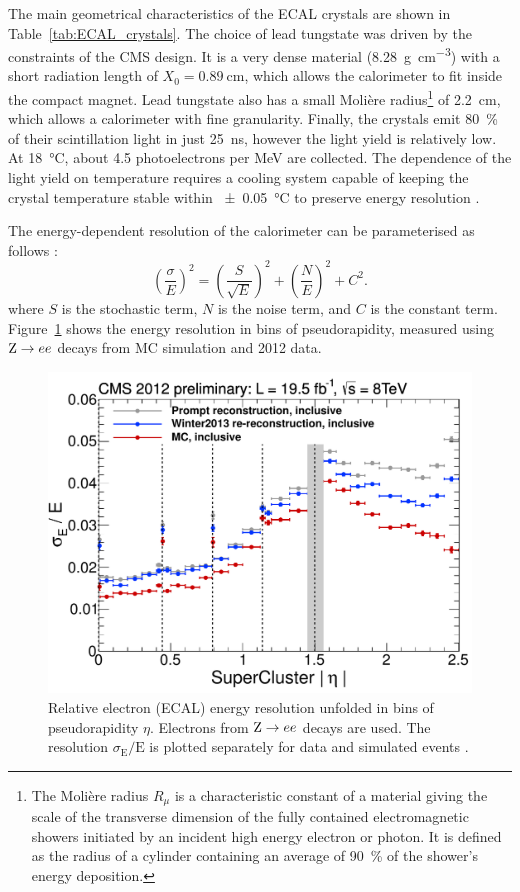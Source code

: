 The main geometrical characteristics of the ECAL crystals are shown in Table~\ref{tab:ECAL_crystals}. The choice of lead
tungstate was driven by the constraints of the CMS design. It is a very dense material (\SI{8.28}{g\per\cm\cubed}) with
a short radiation length of $X_0 = \SI{0.89}{\cm}$, which allows the calorimeter to fit inside the compact magnet. Lead
tungstate also has a small Moli\`ere radius\footnote{The Moli\`ere radius $R_\mu$ is a characteristic constant of a
material giving the scale of the transverse dimension of the fully contained electromagnetic showers initiated by an
incident high energy electron or photon. It is defined as the radius of a cylinder containing an average of
\SI{90}{\percent} of the shower's energy deposition.} of \SI{2.2}{\cm}, which allows a calorimeter with fine
granularity. Finally, the crystals emit \SI{80}{\percent} of their scintillation light in just \SI{25}{\ns}, however the
light yield is relatively low. At \SI{18}{\degreeCelsius}, about \num{4.5} photoelectrons per MeV are collected. The
dependence of the light yield on temperature requires a cooling system capable of keeping the crystal temperature stable
within \SI{+-0.05}{\degreeCelsius} to preserve energy resolution \autocite{CMS_TDR1}.

The energy-dependent resolution of the calorimeter can be parameterised as follows \autocite{CMS}:
\begin{equation}
  \left(\frac{\sigma}{E}\right)^2 = \left(\frac{S}{\sqrt E}\right)^2 + \left(\frac{N}{E}\right)^2 + C^2.
\end{equation}
where $S$ is the stochastic term, $N$ is the noise term, and $C$ is the constant term. Figure~\ref{fig:ECAL_resolution}
shows the energy resolution in bins of pseudorapidity, measured using $\mathrm{Z} \rightarrow ee$ decays from MC simulation and
2012 data.

\begin{figure}[htbp]
  \centering
  \leavevmode
  \includegraphics[width=0.7\columnwidth]{ECAL_resolution}
  \caption[Relative ECAL energy resolution in bins of pseudorapidity $\eta$]{Relative electron (ECAL) energy resolution
unfolded in bins of pseudorapidity $\eta$. Electrons from $\mathrm{Z} \rightarrow ee$ decays are used. The resolution
$\sigma_\mathrm{E}/\mathrm{E}$ is plotted separately for data and simulated events \autocite{CMS_ECAL_twiki}.}
  \label{fig:ECAL_resolution}
\end{figure}

